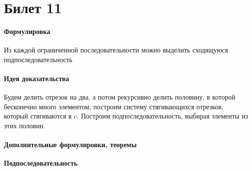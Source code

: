 \documentclass[a4paper,10pt]{article}
\begin{document}
	\section{Билет 11}
	\begin{center} 
		\item \paragraph{Формулировка} 
	\end{center}
	Из каждой ограниченной последовательности можно выделить сходящуюся подпоследовательность
	\begin{center} 
		\item \paragraph{Идея доказательства} 
	\end{center}
	Будем делить отрезок на два, а потом рекурсивно делить половину, в которой бесконечно много элементом, построим систему стягивающихся отрезков, который стягиваются в $c$. Построим подпоследовательность, выбирая элементы из этих половин.
	\begin{center} 
		\item \paragraph{Дополнительные формулировки, теоремы} 
	\end{center}
	\textbf{Подпоследовательность}
\end{document}
